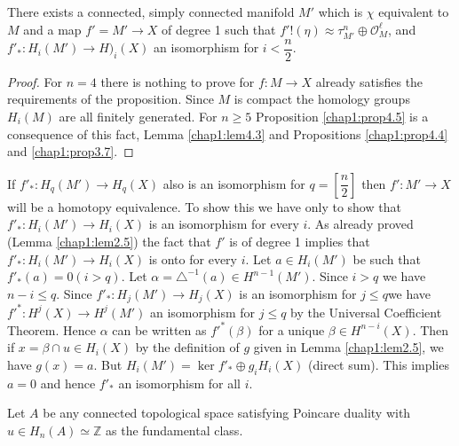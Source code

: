  \begin{prop}\label{chap1:prop4.5}%
There exists a connected, simply connected manifold $M'$ which is
$\chi$ equivalent to $M$ and a map $f' = M' \rightarrow X $ of degree
1 such that $f' ! (\eta) \approx \tau^n_{M'} \oplus \mathscr{O}^\ell_M$, and
$f'_* : H_i (M') \rightarrow H)_i (X) $ an isomorphism for $i <
\dfrac{n}{2}$.   
 \end{prop} 

 \begin{proof}
For $n =4$ there is nothing to prove for $f:M \rightarrow X$ already
satisfies the requirements of the proposition. Since $M$ is compact
the homology groups $H_i (M) $ are all finitely generated. For $ n
\geq 5$ Proposition \ref{chap1:prop4.5} is a consequence of this fact,
Lemma \ref{chap1:lem4.3} and 
Propositions \ref{chap1:prop4.4} and \ref{chap1:prop3.7}.  
 \end{proof} 

\setcounter{dashremark}{4}
\begin{dashremark}\label{chap1:dashrem4.5'}%
\; If $f'_{*} : H_q (M') \rightarrow H_q (X) $ also is an isomorphism for
$q = [\dfrac{n}{2}]$ then $f' :M' \rightarrow X $ will be a homotopy
equivalence. To show this we have only to show that $f'_{*}: H_i (M')
\rightarrow H_i (X) $ is an isomorphism for every $i$. As already
proved (Lemma \ref{chap1:lem2.5}) the fact that $f'$ is of degree 1 implies that
$f'_{*} : H_i (M') \rightarrow H_i (X)$ is onto for every $i$. Let $a
\in H_i (M')$ be such that $f'_*(a)=0 (i>q)$. Let
$\alpha=\triangle^{-1}(a) \in H^{n-1}(M')$. Since $i > q$ we have
$n-i \leq q$. Since $f'_*: H_j (M') \to H_j(X)$ is an isomorphism for $j
\leq q$\pageoriginale we have $f'^*: H^j (X) \to H^j (M')$ an isomorphism
for $j \leq q$ by the Universal Coefficient
Theorem. Hence $\alpha$ can be 
written as $f'^* (\beta)$ for a unique $\beta \in
H^{n-i}(X)$. Then if $x = \beta \cap u \in H_i (X)$ by the
definition of $g$ given in Lemma \ref{chap1:lem2.5}, we have $g(x) = a$. But $H_i
(M')= \ker f'_* \oplus g_i H_i (X)$ (direct sum). This implies $a = 0$
and hence $f'_*$ an isomorphism for all $i$. 

Let $A$ be any connected topological space satisfying Poincare duality
with $u \in H_n (A) \simeq \mathbb{Z}$ as the fundamental class. 
 \end{dashremark}

